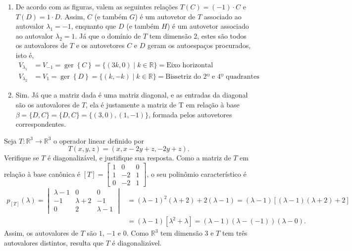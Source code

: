\documentclass[12pt,a4paper]{article}
\newcommand*\ger[1]{\operatorname{ger}\left\{#1\right\}}
\newcommand*\R{\mathbb{R}}
\begin{document}
\begin{ExerciseList}
\Answer
\begin{enumerate}
\item De acordo com as figuras, valem as seguintes relações $T(C) = (-1) \cdot C$ e $T(D) = 1 \cdot D$. Assim, $C$ (e também $G$) é um autovetor de $T$ associado ao autovalor $\lambda_1 = -1$, enquanto que $D$ (e também $H$) é um autovetor associado ao autovalor $\lambda_2 = 1$. Já que o domínio de $T$ tem dimensão 2, estes são todos os autovalores de $T$ e os autovetores $C$ e $D$ geram os autoespaços procurados, isto é,
\begin{align*}
V_{\lambda_1}
& = V_{-1} = \ger{ C } = \{ (3k, 0) \mid k \in \R \} = \text{Eixo horizontal} \\
V_{\lambda_2}
& = V_{1} = \ger{ D } = \{ (k, -k) \mid k \in \R \} = \text{Bissetriz do 2º e 4º quadrantes}
\end{align*}

\item Sim. Já que a matriz dada é uma matriz diagonal, e as entradas da diagonal são os autovalores de $T$, ela é justamente a matriz de T em relação à base $\beta = \{ D, C \} = \{ D, C \} = \{ (3,0), (1,-1) \}$, formada pelos autovetores correspondentes.
\end{enumerate}

\Exercise[title={3,0}]
Seja $T : \R^3 \to \R^3$ o operador linear definido por
\[
T(x,y,z) = (x,x-2y+z,-2y+z).
\]
Verifique se $T$ é diagonalizável, e justifique sua resposta.
\Answer
Como a matriz de $T$ em relação à base canônica é $[T] =
\begin{bmatrix}
1 &  0 &  0\\
1 & -2 &  1\\
0 & -2 &  1
\end{bmatrix}$, o seu polinômio característico é
\begin{align*}
p_{[T]}(\lambda)
= \begin{vmatrix}
\lambda - 1 &          0 &            0\\
        - 1 & \lambda +2 &          - 1\\
          0 &          2 &  \lambda - 1
\end{vmatrix}
& =(\lambda - 1)^2(\lambda +2)+2(\lambda - 1)
  =(\lambda - 1)[(\lambda - 1)(\lambda +2)+2]\\
&=(\lambda - 1)[\lambda^2 +\lambda]
 =(\lambda - 1)(\lambda -(-1))(\lambda-0).
\end{align*}
Assim, os autovalores de $T$ são $1$, $-1$ e $0$. Como $\R^3$ tem dimensão $3$ e $T$ tem três autovalores distintos, resulta que $T$ é diagonalizável.


\end{ExerciseList}
\end{document}
